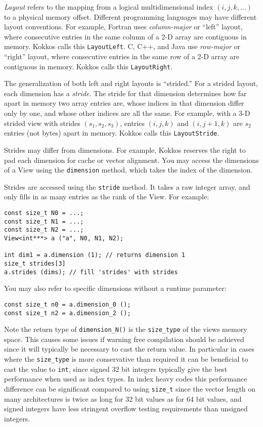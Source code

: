 \emph{Layout} refers to the mapping from a logical multidimensional
index $(i, j, k, \dots)$ to a physical memory offset.  Different
programming languages may have different layout conventions.  For
example, Fortran uses \emph{column-major} or ``left'' layout, where
consecutive entries in the same column of a 2-D array are contiguous
in memory.  Kokkos calls this \lstinline!LayoutLeft!.  C, C++, and Java use
\emph{row-major} or ``right'' layout, where consecutive entries in the
same row of a 2-D array are contiguous in memory.  Kokkos calls this
\lstinline!LayoutRight!.

The generalization of both left and right layouts is ``strided.''  For
a strided layout, each dimension has a \emph{stride}.  The stride for
that dimension determines how far apart in memory two array entries
are, whose indices in that dimension differ only by one, and whose
other indices are all the same.  For example, with a 3-D strided view
with strides $(s_1, s_2, s_3)$, entries $(i, j, k)$ and $(i, j+1, k)$
are $s_2$ entries (not bytes) apart in memory.  Kokkos calls this
\lstinline!LayoutStride!.

Strides may differ from dimensions.  For example, Kokkos reserves the
right to pad each dimension for cache or vector alignment.  You may
access the dimensions of a View using the \lstinline!dimension! method,
which takes the index of the dimension.

Strides are accessed using the \lstinline!stride! method.  It takes a raw
integer array, and only fills in as many entries as the rank of the View.
For example:
\begin{lstlisting}
const size_t N0 = ...;
const size_t N1 = ...;
const size_t N2 = ...;
View<int***> a ("a", N0, N1, N2);

int dim1 = a.dimension (1); // returns dimension 1
size_t strides[3]
a.strides (dims); // fill 'strides' with strides
\end{lstlisting}
You may also refer to specific dimensions without a runtime parameter:
\begin{lstlisting}
const size_t n0 = a.dimension_0 ();
const size_t n2 = a.dimension_2 ();
\end{lstlisting}

Note the return type of \lstinline|dimension_N()| is the \lstinline|size_type| of the 
views memory space. This causes some issues if warning free compilation
should be achieved since it will typically be necessary to cast the return value.
In particular in cases where the \lstinline|size_type| is more conservative than 
required it can be beneficial to cast the value to \lstinline|int|, since signed 32 bit
integers typically give the best performance when used as index types. In index heavy 
codes this performance difference can be significant compared to using \lstinline|size_t| 
since the vector length on many architectures is twice as long for 32 bit values as for
64 bit values, and signed integers have less stringent overflow testing requirements than
unsigned integers. 

